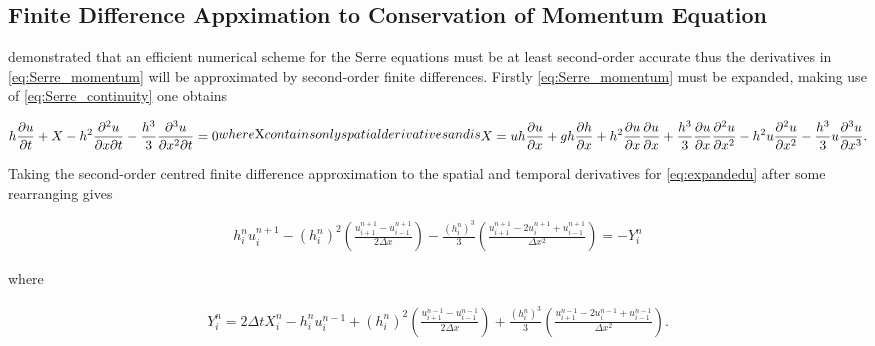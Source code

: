 \documentclass[SingleSpace,12pt,Journal]{Serre_ASCE}
\begin{document}
\subsection{Finite Difference Appximation to Conservation of Momentum Equation} 
\label{subsec:FDA2conmom}
 demonstrated that an efficient numerical scheme for the Serre equations must be at least second-order accurate thus the derivatives in \eqref{eq:Serre_momentum} will be approximated by second-order finite differences. Firstly \eqref{eq:Serre_momentum} must be expanded, making use of \eqref{eq:Serre_continuity} one obtains
\begin{linenomath*}
\begin{subequations}
\begin{gather}
h\dfrac{\partial u}{\partial t} + X - h^2\frac{\partial^2 u}{\partial x \partial t} - \frac{h^3}{3}\frac{\partial^3 u}{\partial x^2 \partial t}  =0 
\label{eq:expandedu}
\end{gather}
where $X$ contains only spatial derivatives and is
\begin{gather}
X = uh\frac{\partial u}{\partial x} + gh\frac{\partial h}{\partial x} + h^2\frac{\partial u}{\partial x}\frac{\partial u}{\partial x} + \frac{h^3}{3}\frac{\partial u}{\partial x}\frac{\partial^2 u}{\partial x^2} - h^2u\frac{\partial^2 u}{\partial x^2}- \frac{h^3}{3}u\frac{\partial^3 u}{\partial x^3} .
\end{gather}
\end{subequations}
\end{linenomath*} Taking the second-order centred finite difference approximation to the spatial and temporal derivatives for \eqref{eq:expandedu} after some rearranging gives
\begin{linenomath*}
\begin{gather}
h^{n}_iu^{n+1}_i - \left(h^{n}_i\right)^2 \left(\frac{u^{n+1}_{i+1} -u^{n+1}_{i-1} }{2 \Delta x}\right) - \frac{\left(h^{n}_i\right)^3}{3}\left(\frac{u^{n+1}_{i+1} - 2u^{n+1}_{i} + u^{n+1}_{i-1} }{\Delta x^2}\right) = - Y^n_i 
\label{eq:expandedutdisc3}
\end{gather}
\end{linenomath*}
where
\begin{linenomath*}
\begin{gather*}
Y_i^n = 2\Delta tX_i^{n} - h_i^{n}u_i^{n-1} + \left(h_i^{n}\right)^2\left(\frac{u^{n-1}_{i+1} -u^{n-1}_{i-1} }{2 \Delta x}\right) + \frac{\left(h_i^{n}\right)^3}{3}\left(\frac{u^{n-1}_{i+1} - 2u^{n-1}_{i} + u^{n-1}_{i-1} }{\Delta x^2}\right) .
\label{eq:expandfactor Xp}
\end{gather*}
\end{linenomath*}
\end{document}
